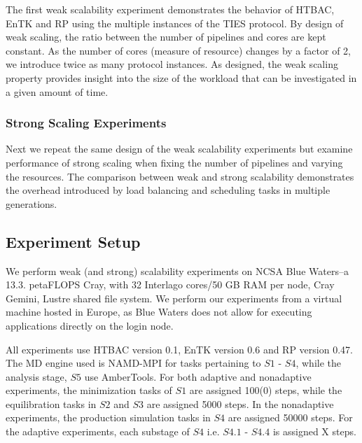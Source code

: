 The first weak scalability experiment demonstrates the behavior of HTBAC, EnTK
and RP using the multiple instances of the TIES protocol. By design of weak
scaling, the ratio between the number of pipelines and cores are kept
constant.   As the number of
cores (measure of resource) changes by a factor of 2, we introduce twice as
many protocol instances. As designed, the weak scaling property provides
insight into the size of the workload that can be investigated in a given
amount of time.






\subsubsection {Strong Scaling Experiments} 

Next we repeat the same design of the weak scalability 
experiments but examine performance of strong scaling when fixing the number of 
pipelines and varying the resources. The comparison between weak and strong 
scalability demonstrates the overhead introduced by load balancing and 
scheduling tasks in multiple generations.

\subsection{Experiment Setup}\label{ssec:exp_design}

We perform weak (and strong) scalability experiments on NCSA Blue Waters--a 13.3. petaFLOPS Cray, with 32 Interlago cores/50 GB RAM per node, Cray Gemini, Lustre shared file system. We perform our 
experiments from a virtual machine hosted in Europe, as Blue 
Waters does not allow for executing applications directly on
the login node. 

All experiments use HTBAC version 0.1, EnTK version 0.6 and RP 
version 0.47. The MD engine used is NAMD-MPI for tasks pertaining to $S1$ - $S4$, while the analysis stage, $S5$ use AmberTools. For both adaptive and nonadaptive experiments, the minimization 
tasks of $S1$ are assigned 100(0) steps, while the equilibration
tasks in $S2$ and $S3$ are assigned 5000 steps. In the nonadaptive experiments, the production 
simulation tasks in $S4$ are assigned 50000 steps. For the
adaptive experiments, each substage of $S4$ i.e. $S4.1$ - $S4.4$ is assigned X steps. 

